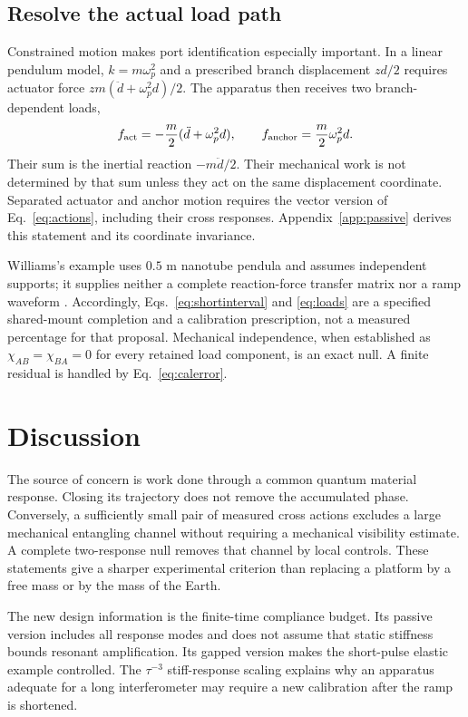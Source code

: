 \documentclass[aps,pra,reprint,amsmath,amssymb,longbibliography,floatfix]{revtex4-2}
\begin{document}
\subsection{Resolve the actual load path}
Constrained motion makes port identification especially important. In a linear pendulum model, $k=m\omega_p^2$ and a prescribed branch displacement $zd/2$ requires actuator force $zm(\ddot d+\omega_p^2d)/2$. The apparatus then receives two branch-dependent loads,
\begin{equation}
f_{\rm act}=-\frac m2(\ddot d+\omega_p^2d),\qquad
f_{\rm anchor}=\frac m2\omega_p^2d.
\label{eq:loads}
\end{equation}
Their sum is the inertial reaction $-m\ddot d/2$. Their mechanical work is not determined by that sum unless they act on the same displacement coordinate. Separated actuator and anchor motion requires the vector version of Eq.~\eqref{eq:actions}, including their cross responses. Appendix~\ref{app:passive} derives this statement and its coordinate invariance.

Williams's example uses $0.5$ m nanotube pendula and assumes independent supports; it supplies neither a complete reaction-force transfer matrix nor a ramp waveform \cite{Williams}. Accordingly, Eqs.~\eqref{eq:shortinterval} and \eqref{eq:loads} are a specified shared-mount completion and a calibration prescription, not a measured percentage for that proposal. Mechanical independence, when established as $\chi_{AB}=\chi_{BA}=0$ for every retained load component, is an exact null. A finite residual is handled by Eq.~\eqref{eq:calerror}.

\section{Discussion}
The source of concern is work done through a common quantum material response. Closing its trajectory does not remove the accumulated phase. Conversely, a sufficiently small pair of measured cross actions excludes a large mechanical entangling channel without requiring a mechanical visibility estimate. A complete two-response null removes that channel by local controls. These statements give a sharper experimental criterion than replacing a platform by a free mass or by the mass of the Earth.

The new design information is the finite-time compliance budget. Its passive version includes all response modes and does not assume that static stiffness bounds resonant amplification. Its gapped version makes the short-pulse elastic example controlled. The $\tau^{-3}$ stiff-response scaling explains why an apparatus adequate for a long interferometer may require a new calibration after the ramp is shortened.
\end{document}
